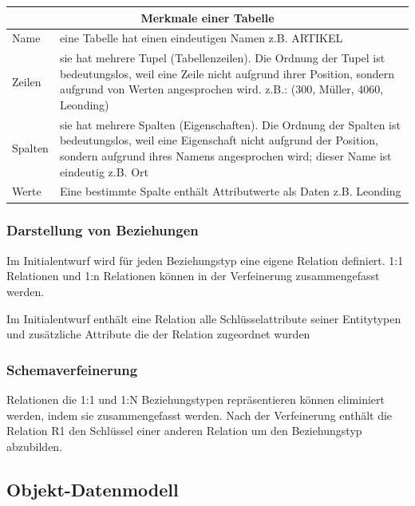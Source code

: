\begin{center}
    \begin{tabular}{ | l | p{} |}
        \hline
        \multicolumn{2}{|c|}{\textbf{Merkmale einer Tabelle}} \\ \hline
        Name & eine Tabelle hat einen eindeutigen Namen
        z.B. ARTIKEL \\ \hline
        Zeilen & sie hat mehrere Tupel (Tabellenzeilen). Die Ordnung der Tupel ist bedeutungslos, weil eine Zeile nicht aufgrund ihrer Position, sondern aufgrund von Werten angesprochen wird.
        z.B.: (300, Müller, 4060, Leonding)        \\ \hline
        Spalten & sie hat mehrere Spalten (Eigenschaften). Die Ordnung der Spalten ist bedeutungslos, weil eine Eigenschaft nicht aufgrund der Position, sondern aufgrund ihres Namens angesprochen wird; dieser Name ist eindeutig
        z.B. Ort   \\ \hline     
        Werte & Eine bestimmte Spalte enthält Attributwerte als Daten
        z.B. Leonding\\ \hline        
    \end{tabular}
\end{center}

\subsubsection{Darstellung von Beziehungen}

Im Initialentwurf wird für jeden Beziehungstyp eine eigene Relation definiert.
1:1 Relationen und 1:n Relationen können in der Verfeinerung zusammengefasst werden. 

Im Initialentwurf enthält eine Relation alle Schlüsselattribute seiner Entitytypen und zusätzliche Attribute die der Relation zugeordnet wurden

\subsubsection{Schemaverfeinerung}

Relationen die 1:1 und 1:N Beziehungstypen repräsentieren können eliminiert werden, indem sie zusammengefasst werden. Nach der Verfeinerung enthält die Relation R1 den Schlüssel einer anderen Relation um den Beziehungstyp abzubilden.

\subsection{Objekt-Datenmodell}

